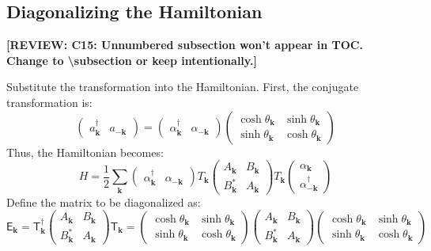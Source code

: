 \documentclass[aps, prx, nofootinbib, superscriptaddress]{revtex4-2}
\newcommand{\REVIEW}[1]{{\color{reviewcolor}\bfseries [REVIEW: #1]}}
\begin{document}
\subsection*{Diagonalizing the Hamiltonian}
\REVIEW{C15: Unnumbered subsection won't appear in TOC. Change to \textbackslash subsection or keep intentionally.}

Substitute the transformation into the Hamiltonian. First, the conjugate transformation is:
\begin{equation}
    \begin{pmatrix}
        a^{\dagger}_{\mathbf{k}} & a_{-\mathbf{k}}
    \end{pmatrix}
    =
    \begin{pmatrix}
        \alpha^{\dagger}_{\mathbf{k}} & \alpha_{-\mathbf{k}}
    \end{pmatrix}
    \begin{pmatrix}
        \cosh \theta_{\mathbf{k}} & \sinh \theta_{\mathbf{k}} \\
        \sinh \theta_{\mathbf{k}} & \cosh \theta_{\mathbf{k}}
    \end{pmatrix}
\end{equation}
Thus, the Hamiltonian becomes:
\begin{equation}
    H = \frac{1}{2} \sum_{\mathbf{k}}
    \begin{pmatrix}
        \alpha^{\dagger}_{\mathbf{k}} & \alpha_{-\mathbf{k}}
    \end{pmatrix}
    T_{\mathbf{k}}
    \begin{pmatrix}
        A_{\mathbf{k}} & B_{\mathbf{k}} \\
        B_{\mathbf{k}}^{*} & A_{\mathbf{k}}
    \end{pmatrix}
    T_{\mathbf{k}}
    \begin{pmatrix}
        \alpha_{\mathbf{k}} \\
        \alpha^{\dagger}_{-\mathbf{k}}
    \end{pmatrix}
\end{equation}
Define the matrix to be diagonalized as:
\begin{equation}
    \mathsf{E}_{\mathbf{k}} = \mathsf{T}_{\mathbf{k}}^{\dagger}
    \begin{pmatrix}
        A_{\mathbf{k}} & B_{\mathbf{k}} \\
        B_{\mathbf{k}}^{*} & A_{\mathbf{k}}
    \end{pmatrix}
    \mathsf{T}_{\mathbf{k}}
    =
    \begin{pmatrix}
        \cosh \theta_{\mathbf{k}} & \sinh \theta_{\mathbf{k}} \\
        \sinh \theta_{\mathbf{k}} & \cosh \theta_{\mathbf{k}}
    \end{pmatrix}
    \begin{pmatrix}
        A_{\mathbf{k}} & B_{\mathbf{k}} \\
        B_{\mathbf{k}}^{*} & A_{\mathbf{k}}
    \end{pmatrix}
    \begin{pmatrix}
        \cosh \theta_{\mathbf{k}} & \sinh \theta_{\mathbf{k}} \\
        \sinh \theta_{\mathbf{k}} & \cosh \theta_{\mathbf{k}}
    \end{pmatrix}
\end{equation}
\end{document}
